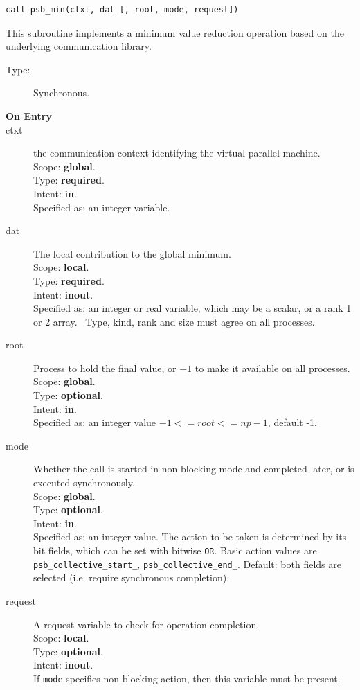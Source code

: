 \begin{verbatim}
call psb_min(ctxt, dat [, root, mode, request])
\end{verbatim}

This subroutine implements a minimum value reduction
operation based on the underlying communication library. 
\begin{description}
\item[Type:] Synchronous.
\item[\bf  On Entry ]
\item[ctxt] the communication context identifying the virtual
  parallel machine.\\
Scope: {\bf global}.\\
Type: {\bf required}.\\
Intent: {\bf in}.\\
Specified as: an integer variable.
\item[dat] The local contribution to the global minimum.\\
Scope: {\bf local}.\\
Type: {\bf required}.\\
Intent: {\bf inout}.\\
Specified as: an integer  or real variable, which may be a
scalar, or a rank 1 or 2 array. \
Type, kind, rank and size must agree on all processes.
\item[root] Process to hold the final value, or $-1$ to make it available
  on all processes.\\
Scope: {\bf global}.\\
Type: {\bf optional}.\\
Intent: {\bf in}.\\
Specified as: an integer value $-1<= root <= np-1$, default -1. \\
\item[mode] Whether the call is started in non-blocking mode and completed
  later, or is executed synchronously.\\
Scope: {\bf global}.\\
Type: {\bf optional}.\\
Intent: {\bf in}.\\
Specified as: an integer value. The action to be taken is determined
by its bit fields, which can be set with bitwise \verb|OR|. Basic
action values are \verb|psb_collective_start_|, \verb|psb_collective_end_|.
Default:  both fields are selected (i.e. require synchronous completion).\\
\item[request] A request variable to check for operation completion.\\
Scope: {\bf local}.\\
Type: {\bf optional}.\\
Intent: {\bf inout}.\\
If \verb|mode| specifies non-blocking action, then this
variable must be present.
\end{description}


